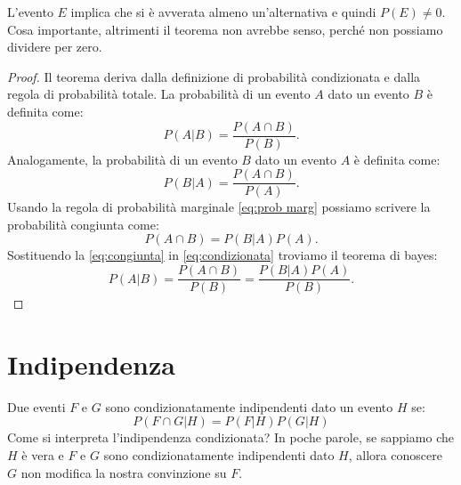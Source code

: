 \documentclass[../main.tex]{subfiles}
\begin{document}
\hfill \break
L'evento $E$ implica che si è avverata almeno un'alternativa e quindi $P(E)\ne 0$. Cosa importante, altrimenti il teorema non avrebbe senso, perché non possiamo dividere per zero.
\begin{proof}
Il teorema deriva dalla definizione di probabilità condizionata e dalla regola di probabilità totale.
La probabilità di un evento $A$ dato un evento $B$ è definita come:
\begin{equation}\label{eq:condizionata}
    P(A|B)=\frac{P(A\cap B)}{P(B)}.
\end{equation}
Analogamente, la probabilità di un evento $B$ dato un evento $A$ è definita come:
\begin{equation}
    P(B|A)=\frac{P(A\cap B)}{P(A)}.
\end{equation}
Usando la regola di probabilità marginale \ref{eq:prob marg} possiamo scrivere la probabilità congiunta come:
\begin{equation}\label{eq:congiunta}
    P(A \cap B )= P(B|A)P(A).
\end{equation}
Sostituendo la \ref{eq:congiunta} in \ref{eq:condizionata} troviamo il teorema di bayes:
\begin{equation}
    P(A|B)= \frac{P(A \cap B)}{P(B)} =\frac{P(B|A)P(A)}{P(B)}.
\end{equation}
\end{proof}
\section{Indipendenza}
\begin{definition}[Indipendenza]
    Due eventi $F$ e $G$ sono condizionatamente indipendenti dato un evento $H$ se:
    \begin{equation}
        P(F\cap G|H)=P(F|H)P(G|H)
    \end{equation}
Come si interpreta l'indipendenza condizionata? In poche parole, se sappiamo che $H$  è vera e $F$ e $G$ sono condizionatamente indipendenti dato $H$, allora conoscere $G$ non modifica la nostra convinzione su $F$.
\end{definition}
\end{document}
